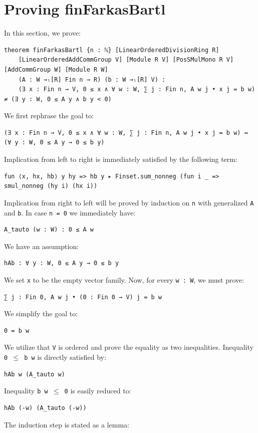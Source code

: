 \documentclass[]{article}
\renewcommand{\.}{\hskip .75pt}
\begin{document}
\newpage
\section*{Proving finFarkasBartl}

In this section, we prove:
\begin{lstlisting}
theorem finFarkasBartl {n : ℕ} [LinearOrderedDivisionRing R]
    [LinearOrderedAddCommGroup V] [Module R V] [PosSMulMono R V] [AddCommGroup W] [Module R W]
    (A : W →ₗ[R] Fin n → R) (b : W →ₗ[R] V) :
    (∃ x : Fin n → V, 0 ≤ x ∧ ∀ w : W, ∑ j : Fin n, A w j • x j = b w) ≠ (∃ y : W, 0 ≤ A y ∧ b y < 0)
\end{lstlisting}
We first rephrase the goal to:
\begin{lstlisting}
(∃ x : Fin n → V, 0 ≤ x ∧ ∀ w : W, ∑ j : Fin n, A w j • x j = b w) ↔ (∀ y : W, 0 ≤ A y → 0 ≤ b y)
\end{lstlisting}
Implication from left to right is immediately satisfied by the following term:
\begin{lstlisting}
fun ⟨x, hx, hb⟩ y hy => hb y ▸ Finset.sum_nonneg (fun i _ => smul_nonneg (hy i) (hx i))
\end{lstlisting}
Implication from right to left will be proved by induction on \texttt{n} with generalized \texttt{A} and \texttt{b}.
In case \texttt{n = 0} we immediately have:
\begin{lstlisting}
A_tauto (w : W) : 0 ≤ A w
\end{lstlisting}
We have an assumption:
\begin{lstlisting}
hAb : ∀ y : W, 0 ≤ A y → 0 ≤ b y
\end{lstlisting}
We set \texttt{x} to be the empty vector family. Now, for every \texttt{w :~W}, we must prove:
\begin{lstlisting}
∑ j : Fin 0, A w j • (0 : Fin 0 → V) j = b w
\end{lstlisting}
We simplify the goal to:
\begin{lstlisting}
0 = b w
\end{lstlisting}
We utilize that \texttt{V} is ordered and prove the equality as two inequalities.
Inequality \texttt{0 $\le$ b w} is directly satisfied by:
\begin{lstlisting}
hAb w (A_tauto w)
\end{lstlisting}
Inequality \texttt{b w $\le$ 0} is easily reduced to:
\begin{lstlisting}
hAb (-w) (A_tauto (-w))
\end{lstlisting}
The induction step is stated as a lemma:
\end{document}
